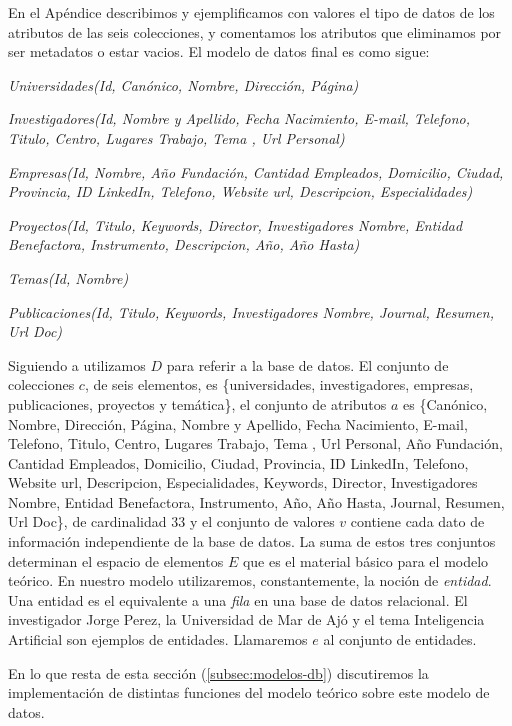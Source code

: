 En el Apéndice  describimos y ejemplificamos con valores el tipo de datos de los atributos de las seis colecciones, y comentamos los atributos que eliminamos por ser metadatos o estar vacios. El modelo de datos final es como sigue:

\textit{Universidades(Id, Canónico, Nombre, Dirección, Página)}

\textit{Investigadores(Id, Nombre y Apellido,	Fecha Nacimiento,	E-mail,   Telefono,   Titulo,  Centro, Lugares Trabajo,	Tema ,	Url Personal)}

\textit{Empresas(Id, Nombre, Año Fundación, Cantidad Empleados, Domicilio, Ciudad, Provincia, ID LinkedIn, Telefono, Website url, Descripcion, Especialidades)}

\textit{Proyectos(Id, Titulo, Keywords, Director, Investigadores Nombre, Entidad Benefactora, Instrumento, Descripcion, Año, Año Hasta)}

\textit{Temas(Id, Nombre)}

\textit{Publicaciones(Id, Titulo, Keywords, Investigadores Nombre, Journal, Resumen, Url Doc)}


Siguiendo a \cite{QADB1} utilizamos $D$ para referir a la base de datos. El conjunto de colecciones $c$, de seis elementos, es \{universidades, investigadores, empresas, publicaciones, proyectos y temática\}, el conjunto de atributos $a$ es \{Canónico, Nombre, Dirección, Página, Nombre y Apellido, Fecha Nacimiento, E-mail, Telefono, Titulo, Centro, Lugares Trabajo, Tema , Url Personal, Año Fundación, Cantidad Empleados, Domicilio, Ciudad, Provincia, ID LinkedIn, Telefono, Website url, Descripcion, Especialidades, Keywords, Director, Investigadores Nombre, Entidad Benefactora, Instrumento, Año, Año Hasta, Journal, Resumen, Url Doc\}, de cardinalidad 33 y el conjunto de valores $v$ contiene cada dato de información independiente de la base de datos. La suma de estos tres conjuntos determinan el espacio de elementos $E$ que es el material básico para el modelo teórico. En nuestro modelo utilizaremos, constantemente, la noción de \textit{entidad}. Una entidad es el equivalente a una \textit{fila} en una base de datos relacional. El investigador Jorge Perez, la Universidad de Mar de Ajó y el tema Inteligencia Artificial son ejemplos de entidades. Llamaremos $e$ al conjunto de entidades.

En lo que resta de esta sección (\ref{subsec:modelos-db}) discutiremos la implementación de distintas funciones del modelo teórico sobre este modelo de datos.

